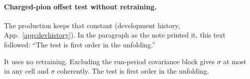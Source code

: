 \paragraph{Charged-pion offset test without retraining.} The production keeps that constant (development history, App.~\ref{app:devhistory}). In the paragraph as the note printed it, this text followed: ``The test is first order in the unfolding.''\par It uses no retraining. Excluding the run-period covariance block gives $\sigma$ at most in any cell and $\sigma$ coherently. The test is first order in the unfolding.
